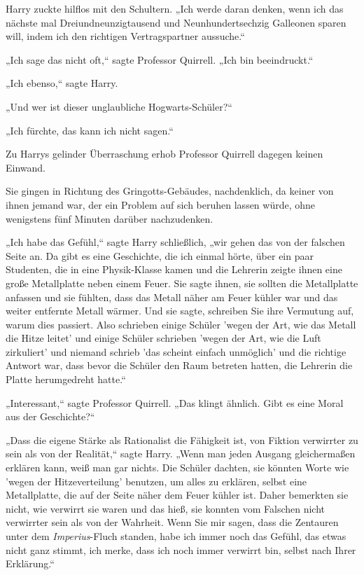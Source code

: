 {Harry zuckte hilflos mit den Schultern. „Ich werde daran denken, wenn ich das nächste mal Dreiundneunzigtausend und Neunhundertsechzig Galleonen sparen will, indem ich den richtigen Vertragspartner aussuche.“

„Ich sage das nicht oft,“ sagte Professor Quirrell. „Ich bin beeindruckt.“

„Ich ebenso,“ sagte Harry.

„Und wer ist dieser unglaubliche Hogwarts-Schüler?“

„Ich fürchte, das kann ich nicht sagen.“

Zu Harrys gelinder Überraschung erhob Professor Quirrell dagegen keinen Einwand.

Sie gingen in Richtung des Gringotts-Gebäudes, nachdenklich, da keiner von ihnen jemand war, der ein Problem auf sich beruhen lassen würde, ohne wenigstens fünf Minuten darüber nachzudenken.

„Ich habe das Gefühl,“ sagte Harry schließlich, „wir gehen das von der falschen Seite an. Da gibt es eine Geschichte, die ich einmal hörte, über ein paar Studenten, die in eine Physik-Klasse kamen und die Lehrerin zeigte ihnen eine große Metallplatte neben einem Feuer. Sie sagte ihnen, sie sollten die Metallplatte anfassen und sie fühlten, dass das Metall näher am Feuer kühler war und das weiter entfernte Metall wärmer. Und sie sagte, schreiben Sie ihre Vermutung auf, warum dies passiert. Also schrieben einige Schüler 'wegen der Art, wie das Metall die Hitze leitet' und einige Schüler schrieben 'wegen der Art, wie die Luft zirkuliert' und niemand schrieb 'das scheint einfach unmöglich' und die richtige Antwort war, dass bevor die Schüler den Raum betreten hatten, die Lehrerin die Platte herumgedreht hatte.“

„Interessant,“ sagte Professor Quirrell. „Das klingt ähnlich. Gibt es eine Moral aus der Geschichte?“

„Dass die eigene Stärke als Rationalist die Fähigkeit ist, von Fiktion verwirrter zu sein als von der Realität,“ sagte Harry. „Wenn man jeden Ausgang gleichermaßen erklären kann, weiß man gar nichts. Die Schüler dachten, sie könnten Worte wie 'wegen der Hitzeverteilung' benutzen, um alles zu erklären, selbst eine Metallplatte, die auf der Seite näher dem Feuer kühler ist. Daher bemerkten sie nicht, wie verwirrt sie waren und das hieß, sie konnten vom Falschen nicht verwirrter sein als von der Wahrheit. Wenn Sie mir sagen, dass die Zentauren unter dem \emph{Imperius}-Fluch standen, habe ich immer noch das Gefühl, das etwas nicht ganz stimmt, ich merke, dass ich noch immer verwirrt bin, selbst nach Ihrer Erklärung.“

}
